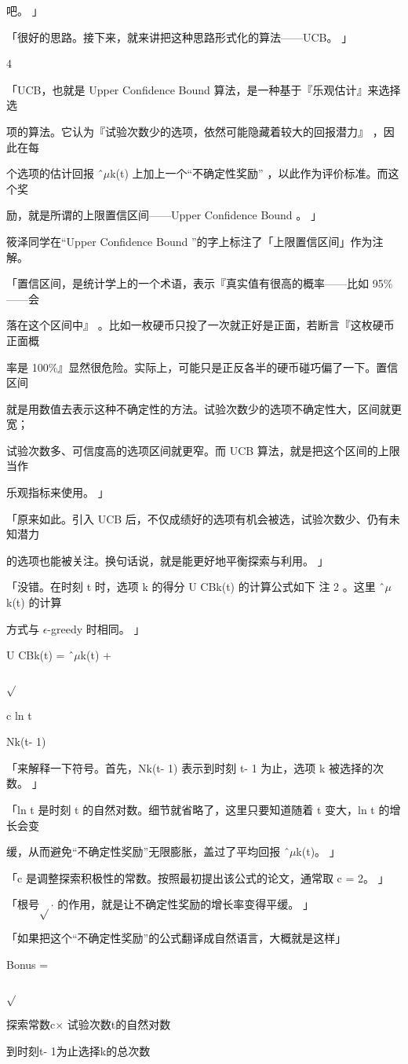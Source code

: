 吧。 」\par
「很好的思路。接下来，就来讲把这种思路形式化的算法——UCB。 」\par
4\par
「UCB，也就是 Upper Confidence Bound 算法，是一种基于『乐观估计』来选择选\par
项的算法。它认为『试验次数少的选项，依然可能隐藏着较大的回报潜力』 ，因此在每\par
个选项的估计回报 ˆ$\mu$k(t) 上加上一个“不确定性奖励” ，以此作为评价标准。而这个奖\par
励，就是所谓的上限置信区间——Upper Confidence Bound 。 」\par
筱泽同学在“Upper Confidence Bound ”的字上标注了「上限置信区间」作为注解。\par
「置信区间，是统计学上的一个术语，表示『真实值有很高的概率——比如 95\%——会\par
落在这个区间中』 。比如一枚硬币只投了一次就正好是正面，若断言『这枚硬币正面概\par
率是 100\%』显然很危险。实际上，可能只是正反各半的硬币碰巧偏了一下。置信区间\par
就是用数值去表示这种不确定性的方法。试验次数少的选项不确定性大，区间就更宽；\par
试验次数多、可信度高的选项区间就更窄。而 UCB 算法，就是把这个区间的上限当作\par
乐观指标来使用。 」\par
「原来如此。引入 UCB 后，不仅成绩好的选项有机会被选，试验次数少、仍有未知潜力\par
的选项也能被关注。换句话说，就是能更好地平衡探索与利用。 」\par
「没错。在时刻 t 时，选项 k 的得分 U CBk(t) 的计算公式如下 注 2 。这里 ˆ$\mu$k(t) 的计算\par
方式与 $\epsilon$-greedy 时相同。 」\par
U CBk(t) = ˆ$\mu$k(t) +\par
$\sqrt{}$\par
c ln t\par
Nk(t- 1)\par
「来解释一下符号。首先，Nk(t- 1) 表示到时刻 t- 1 为止，选项 k 被选择的次数。 」\par
「ln t 是时刻 t 的自然对数。细节就省略了，这里只要知道随着 t 变大，ln t 的增长会变\par
缓，从而避免“不确定性奖励”无限膨胀，盖过了平均回报 ˆ$\mu$k(t)。 」\par
「c 是调整探索积极性的常数。按照最初提出该公式的论文，通常取 c = 2。 」\par
「根号$\sqrt{}$$\cdot$ 的作用，就是让不确定性奖励的增长率变得平缓。 」\par
「如果把这个“不确定性奖励”的公式翻译成自然语言，大概就是这样」\par
Bonus =\par
$\sqrt{}$\par
探索常数c$\times$ 试验次数t的自然对数\par
到时刻t- 1为止选择k的总次数\par

